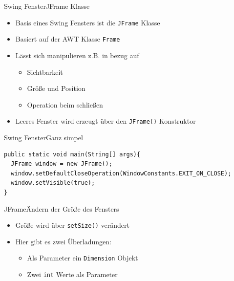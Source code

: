 \begin{frame}{Swing Fenster}{JFrame Klasse}
	\begin{itemize}
		\item Basis eines Swing Fensters ist die \texttt{JFrame} Klasse
		\item Basiert auf der AWT Klasse \texttt{Frame}
		\item Lässt sich manipulieren z.B. in bezug auf
		\begin{itemize}
			\item Sichtbarkeit
			\item Größe und Position
			\item Operation beim schließen
		\end{itemize}
		\item Leeres Fenster wird erzeugt über den \texttt{JFrame()} Konstruktor
	\end{itemize}
\end{frame}

\begin{frame}[fragile]{Swing Fenster}{Ganz simpel}
\lstset{style=java}
\begin{lstlisting}
public static void main(String[] args){
  JFrame window = new JFrame();
  window.setDefaultCloseOperation(WindowConstants.EXIT_ON_CLOSE);
  window.setVisible(true);
}
\end{lstlisting}
\end{frame}

\begin{frame}{JFrame}{Ändern der Größe des Fensters}
    \begin{itemize}
        \item Größe wird über \texttt{setSize()} verändert
        \item Hier gibt es zwei Überladungen:
        \begin{itemize}
            \item Als Parameter ein \texttt{Dimension} Objekt
            \item Zwei \texttt{int} Werte als Parameter
        \end{itemize}
    \end{itemize}
\end{frame}

